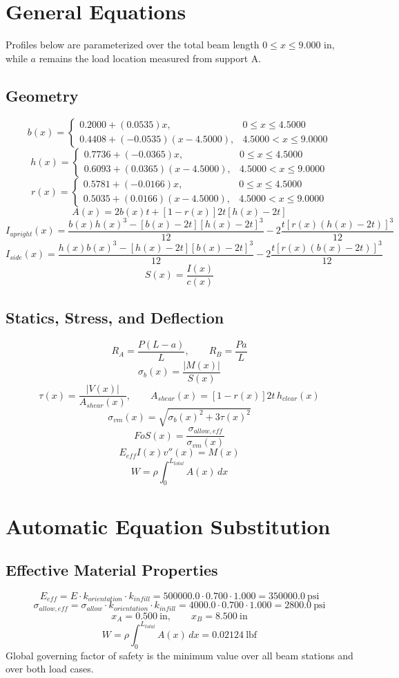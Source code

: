 \documentclass[11pt]{article}
\begin{document}
\section*{General Equations}
Profiles below are parameterized over the total beam length $0 \le x \le 9.000$ in, while $a$ remains the load location measured from support A.
\subsection*{Geometry}
\[
b(x)=\begin{cases}0.2000 + (0.0535)x, & 0 \le x \le 4.5000\\0.4408 + (-0.0535)(x-4.5000), & 4.5000 < x \le 9.0000\end{cases}
\]
\[
h(x)=\begin{cases}0.7736 + (-0.0365)x, & 0 \le x \le 4.5000\\0.6093 + (0.0365)(x-4.5000), & 4.5000 < x \le 9.0000\end{cases}
\]
\[
r(x)=\begin{cases}0.5781 + (-0.0166)x, & 0 \le x \le 4.5000\\0.5035 + (0.0166)(x-4.5000), & 4.5000 < x \le 9.0000\end{cases}
\]
\[
A(x)=2b(x)t+[1-r(x)]2t[h(x)-2t]
\]
\[
I_{upright}(x)=\frac{b(x)h(x)^3-[b(x)-2t][h(x)-2t]^3}{12}-2\frac{t[r(x)(h(x)-2t)]^3}{12}
\]
\[
I_{side}(x)=\frac{h(x)b(x)^3-[h(x)-2t][b(x)-2t]^3}{12}-2\frac{t[r(x)(b(x)-2t)]^3}{12}
\]
\[
S(x)=\frac{I(x)}{c(x)}
\]

\subsection*{Statics, Stress, and Deflection}
\[
R_A=\frac{P(L-a)}{L}, \qquad R_B=\frac{Pa}{L}
\]
\[
\sigma_b(x)=\frac{|M(x)|}{S(x)}
\]
\[
\tau(x)=\frac{|V(x)|}{A_{shear}(x)}, \qquad A_{shear}(x)=[1-r(x)]2t\,h_{clear}(x)
\]
\[
\sigma_{vm}(x)=\sqrt{\sigma_b(x)^2+3\tau(x)^2}
\]
\[
FoS(x)=\frac{\sigma_{allow,eff}}{\sigma_{vm}(x)}
\]
\[
E_{eff}I(x)v''(x)=M(x)
\]
\[
W=\rho\int_0^{L_{total}} A(x)\,dx
\]

\section*{Automatic Equation Substitution}
\subsection*{Effective Material Properties}
\[E_{eff} = E \cdot k_{orientation} \cdot k_{infill} = 500000.0 \cdot 0.700 \cdot 1.000 = 350000.0\ \mathrm{psi}\]
\[\sigma_{allow,eff} = \sigma_{allow} \cdot k_{orientation} \cdot k_{infill} = 4000.0 \cdot 0.700 \cdot 1.000 = 2800.0\ \mathrm{psi}\]
\[x_A = 0.500\ \mathrm{in}, \qquad x_B = 8.500\ \mathrm{in}\]
\[W = \rho \int_0^{L_{total}} A(x)\,dx = 0.02124\ \mathrm{lbf}\]
Global governing factor of safety is the minimum value over all beam stations and over both load cases.
\end{document}
